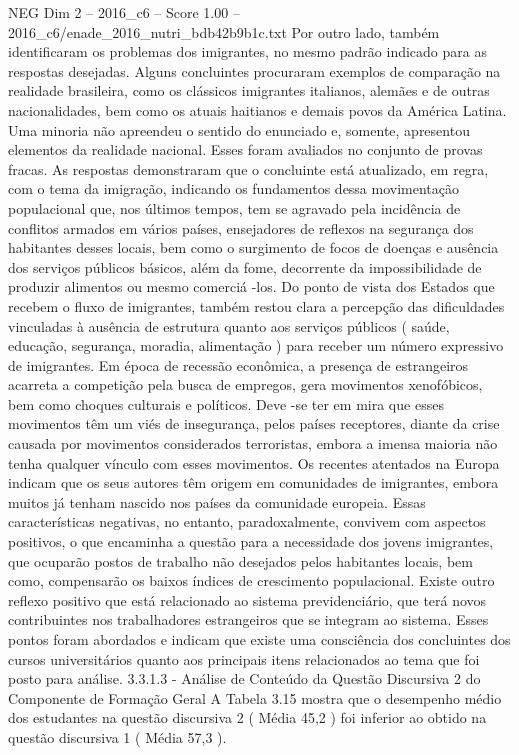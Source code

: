 \begin{textsample}{NEG Dim 2 – 2016\_c6 – Score 1.00 – 2016\_c6/enade\_2016\_nutri\_bdb42b9b1c.txt}
Por outro lado, também identificaram os problemas dos imigrantes, no mesmo padrão indicado para as respostas desejadas.
Alguns concluintes procuraram exemplos de comparação na realidade brasileira, como os clássicos imigrantes italianos, alemães e de outras nacionalidades, bem como os atuais haitianos e demais povos da América Latina.
Uma minoria não apreendeu o sentido do enunciado e, somente, apresentou elementos da realidade nacional.
Esses foram avaliados no conjunto de provas fracas.
As respostas demonstraram que o concluinte está atualizado, em regra, com o tema da imigração, indicando os fundamentos dessa movimentação populacional que, nos últimos tempos, tem se agravado pela incidência de conflitos armados em vários países, ensejadores de reflexos na segurança dos habitantes desses locais, bem como o surgimento de focos de doenças e ausência dos serviços públicos básicos, além da fome, decorrente da impossibilidade de produzir alimentos ou mesmo comerciá -los.
Do ponto de vista dos Estados que recebem o fluxo de imigrantes, também restou clara a percepção das dificuldades vinculadas à ausência de estrutura quanto aos serviços públicos ( saúde, educação, segurança, moradia, alimentação ) para receber um número expressivo de imigrantes.
Em época de recessão econômica, a presença de estrangeiros acarreta a competição pela busca de empregos, gera movimentos xenofóbicos, bem como choques culturais e políticos.
Deve -se ter em mira que esses movimentos têm um viés de insegurança, pelos países receptores, diante da crise causada por movimentos considerados terroristas, embora a imensa maioria não tenha qualquer vínculo com esses movimentos.
Os recentes atentados na Europa indicam que os seus autores têm origem em comunidades de imigrantes, embora muitos já tenham nascido nos países da comunidade europeia.
Essas características negativas, no entanto, paradoxalmente, convivem com aspectos positivos, o que encaminha a questão para a necessidade dos jovens imigrantes, que ocuparão postos de trabalho não desejados pelos habitantes locais, bem como, compensarão os baixos índices de crescimento populacional.
Existe outro reflexo positivo que está relacionado ao sistema previdenciário, que terá novos contribuintes nos trabalhadores estrangeiros que se integram ao sistema.
Esses pontos foram abordados e indicam que existe uma consciência dos concluintes dos cursos universitários quanto aos principais itens relacionados ao tema que foi posto para análise. 3.3.1.3 - Análise de Conteúdo da Questão Discursiva 2 do Componente de Formação Geral A Tabela 3.15 mostra que o desempenho médio dos estudantes na questão discursiva 2 ( Média 45,2 ) foi inferior ao obtido na questão discursiva 1 ( Média 57,3 ).

\end{textsample}
